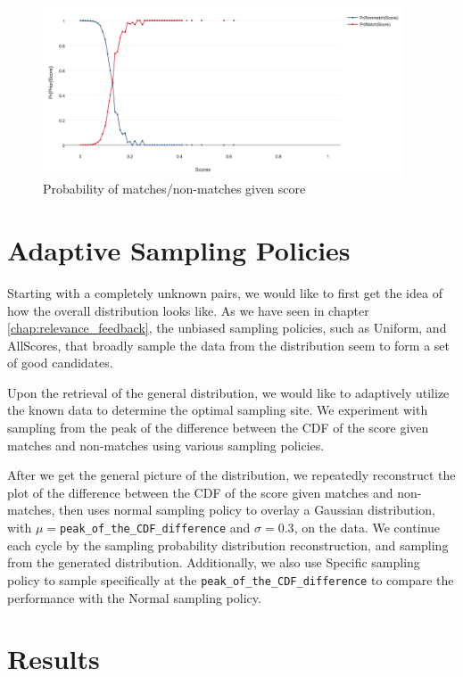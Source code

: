 \begin{figure}[h]
  \centering
  \includegraphics[width=0.95\textwidth]{dataset/otago/pms}
  \caption{Probability of matches/non-matches given score}
  \label{fig:pms_grand}
\end{figure}

\section{Adaptive Sampling Policies} %
\label{sec:sampling_policies}

Starting with a completely unknown pairs, we would like to first get the idea
of how the overall distribution looks like. As we have seen in chapter
\ref{chap:relevance_feedback}, the unbiased sampling policies, such as Uniform,
and AllScores, that broadly sample the data from the distribution seem to form
a set of good candidates.

Upon the retrieval of the general distribution, we would like to adaptively
utilize the known data to determine the optimal sampling site. We experiment
with sampling from the peak of the difference between the CDF of the score
given matches and non-matches using various sampling policies.

After we get the general picture of the distribution, we repeatedly reconstruct
the plot of the difference between the CDF of the score given matches and
non-matches, then uses normal sampling policy to overlay a Gaussian
distribution, with $\mu=$\texttt{peak\_of\_the\_CDF\_difference} and
$\sigma=0.3$, on the data. We continue each cycle by the sampling probability
distribution reconstruction, and sampling from the generated distribution.
Additionally, we also use Specific sampling policy to sample specifically at the
\texttt{peak\_of\_the\_CDF\_difference} to compare the performance with the
Normal sampling policy.

\section{Results}

